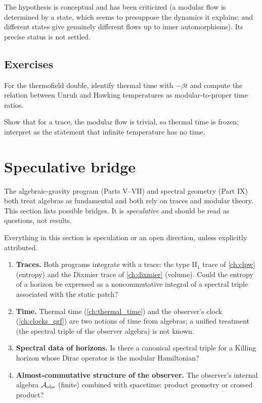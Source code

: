 \begin{whatwrong}
The hypothesis is conceptual and has been criticized (a modular flow is determined by a state, which seems to presuppose the dynamics it explains; and different states give genuinely different flows up to inner automorphisms). Its precise status is not settled.
\end{whatwrong}

\subsection*{Exercises}
\begin{exercise}\label{ex:thermal_time:1}
For the thermofield double, identify thermal time with $-\beta t$ and compute the relation between Unruh and Hawking temperatures as modular-to-proper time ratios.
\end{exercise}
\begin{exercise}\label{ex:thermal_time:2}
Show that for a trace, the modular flow is trivial, so thermal time is frozen; interpret as the statement that infinite temperature has no time.
\end{exercise}

\section{Speculative bridge}\label{ch:bridge}
\skippable

\begin{physmotiv}
The algebraic-gravity program (Parts V--VII) and spectral geometry (Part IX) both treat algebras as fundamental and both rely on traces and modular theory. This section lists possible bridges. It is \emph{speculative} and should be read as questions, not results.
\end{physmotiv}

\begin{unsettled}
Everything in this section is speculation or an open direction, unless explicitly attributed.
\end{unsettled}

\begin{enumerate}
\item \textbf{Traces.} Both programs integrate with a trace: the type II$_1$ trace of \cref{ch:clpw} (entropy) and the Dixmier trace of \cref{ch:dixmier} (volume). Could the entropy of a horizon be expressed as a noncommutative integral of a spectral triple associated with the static patch?
\item \textbf{Time.} Thermal time (\cref{ch:thermal_time}) and the observer's clock (\cref{ch:clocks_qrf}) are two notions of time from algebras; a unified treatment (the spectral triple of the observer algebra) is not known.
\item \textbf{Spectral data of horizons.} Is there a canonical spectral triple for a Killing horizon whose Dirac operator is the modular Hamiltonian?
\item \textbf{Almost-commutative structure of the observer.} The observer's internal algebra $\mathcal{A}_{\rm obs}$ (finite) combined with spacetime: product geometry or crossed product?
\end{enumerate}

